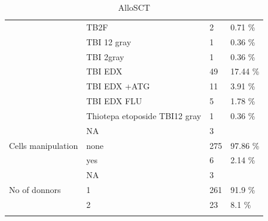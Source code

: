 \documentclass[a4paper,11pt] {article}
\begin{document}
\begin{longtable}{llll}
   & TB2F & 2 & 0.71 \% \\ 
   & TBI 12 gray & 1 & 0.36 \% \\ 
   & TBI 2gray & 1 & 0.36 \% \\ 
   & TBI EDX & 49 & 17.44 \% \\ 
   & TBI EDX +ATG & 11 & 3.91 \% \\ 
   & TBI EDX FLU & 5 & 1.78 \% \\ 
   & Thiotepa etoposide TBI12 gray & 1 & 0.36 \% \\ 
   & NA & 3 &  \\ 
  Cells manipulation & none & 275 & 97.86 \% \\ 
   & yes & 6 & 2.14 \% \\ 
   & NA & 3 &  \\ 
  No of donnors & 1 & 261 & 91.9 \% \\ 
   & 2 & 23 & 8.1 \% \\ 
   \hline
\hline
\caption{AlloSCT} 
\label{tab:g}
\end{longtable}
\end{document}
